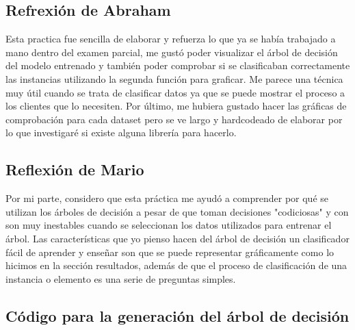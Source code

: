 \documentclass[sigconf,authorversion,nonacm]{acmart}
\begin{document}
\subsection{Refrexión de Abraham}
Esta practica fue sencilla de elaborar y refuerza lo que ya se había trabajado a mano dentro del examen parcial, me gustó poder visualizar el árbol de decisión del modelo entrenado y también poder comprobar si se clasificaban correctamente las instancias utilizando la segunda función para graficar.
Me parece una técnica muy útil cuando se trata de clasificar datos ya que se puede mostrar el proceso a los clientes que lo necesiten.
Por último, me hubiera gustado hacer las gráficas de comprobación para cada dataset pero se ve largo y hardcodeado de elaborar por lo que investigaré si existe alguna librería para hacerlo.


\subsection{Reflexión de Mario}
Por mi parte, considero que esta práctica me ayudó a comprender por qué se utilizan los árboles de decisión a pesar de que toman decisiones "codiciosas" y con son muy inestables cuando se seleccionan los datos utilizados para entrenar el árbol. Las características que yo pienso hacen del árbol de decisión un clasificador fácil de aprender y enseñar son que se puede representar gráficamente como lo hicimos en la sección resultados, además de que el proceso de clasificación de una instancia o elemento es una serie de preguntas simples.





\clearpage

\appendix

\lstset{style=customstyle}

\begin{figure*}
 \section{Código para la generación del árbol de decisión}
  \label{appendix:py}
  
\end{figure*}

\begin{figure*}
  
\end{figure*}
\end{document}

